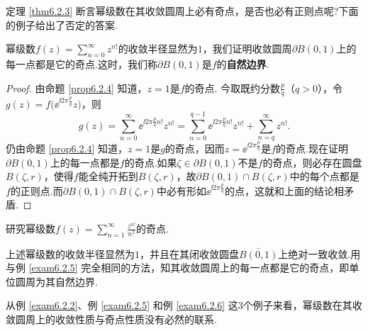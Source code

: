 定理 \ref{thm6.2.3} 断言幂级数在其收敛圆周上必有奇点，是否也必有正则点呢?下面的例子给出了否定的答案.
\begin{example}\label{exam6.2.5}
  幂级数$f(z)=\sum_{n=0}^\infty z^{n!}$的收敛半径显然为$1$，我们证明收敛圆周$\partial B(0,1)$上的每一点都是它的奇点.这时，我们称$\partial B(0,1)$是$f$的\textbf{自然边界}.
\end{example}
\begin{proof}
  由命题 \ref{prop6.2.4} 知道，$z=1$是$f$的奇点. 今取既约分数$\frac pq$（$q>0$），令$g(z)=f\big(\ee^{\ii2\pi\frac pq}z\big)$，则
  \[
    g(z) = \sum_{n=0}^\infty \ee^{\ii2\pi\frac pqn!}z^{n!}
    = \sum_{n=0}^{q-1}\ee^{\ii2\pi\frac pqn!}z^{n!} + \sum_{n=q}^\infty z^{n!}.
  \]
  仍由命题 \ref{prop6.2.4} 知道，$z=1$是$g$的奇点，因而$z=\ee^{\ii2\pi\frac pq}$是$f$的奇点.现在证明$\partial B(0,1)$上的每一点都是$f$的奇点.如果$\zeta\in\partial B(0,1)$不是$f$的奇点，则必存在圆盘$B(\zeta,r)$，使得$f$能全纯开拓到$B(\zeta,r)$，故$\partial B(0,1)\cap B(\zeta,r)$中的每个点都是$f$的正则点.而$\partial B(0,1)\cap B(\zeta,r)$中必有形如$\ee^{\ii2\pi\frac pq}$的点，这就和上面的结论相矛盾.
\end{proof}

\begin{example}\label{exam6.2.6}
  研究幂级数$f(z)=\sum_{n=1}^\infty\frac{z^{n!}}{n^2}$的奇点.
\end{example}
\begin{solution}
  上述幂级数的收敛半径显然为$1$，并且在其闭收敛圆盘$\bar{B(0,1)}$上绝对一致收敛.用与例 \ref{exam6.2.5} 完全相同的方法，知其收敛圆周上的每一点都是它的奇点，即单位圆周为其自然边界.
\end{solution}

从例 \ref{exam6.2.2}、例 \ref{exam6.2.5} 和例 \ref{exam6.2.6} 这3个例子来看，幂级数在其收敛圆周上的收敛性质与奇点性质没有必然的联系.


